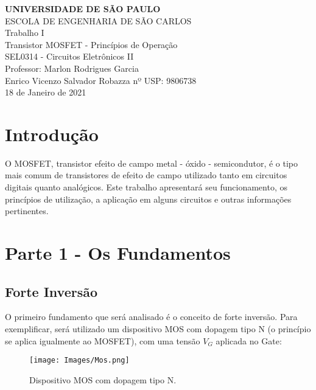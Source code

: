 \documentclass[12pt]{article}
\begin{document}
\setlength{\droptitle}{45mm}    
\begin{titlepage}
\begin{center}
\uppercase{
\textbf{Universidade de São Paulo}\\
\textsc{Escola de Engenharia de São Carlos}
}
\hspace{5mm}\\[6cm]
\Huge{Trabalho I}\\[0.5cm]
\Large{Transistor MOSFET - Princípios de Operação}\\[3cm]
\Large{SEL0314 - Circuitos Eletrônicos II \\ Professor:  Marlon Rodrigues Garcia}\\[4cm]

\large{ 
Enrico Vicenzo Salvador Robazza  nº USP: 9806738\\[3cm]
18 de Janeiro de 2021
}
\end{center}
\end{titlepage}



\section{Introdução}

O MOSFET, transistor efeito de campo metal - óxido - semicondutor, é o tipo mais comum de transistores de efeito de campo utilizado tanto em circuitos digitais quanto analógicos.
	Este trabalho apresentará seu funcionamento, os princípios de utilização, a aplicação em alguns circuitos e outras informações pertinentes.

\section{Parte 1 - Os Fundamentos}

\subsection{Forte Inversão}

O primeiro fundamento que será analisado é o conceito de forte inversão. Para exemplificar, será utilizado um dispositivo MOS com dopagem tipo N (o princípio se aplica igualmente ao MOSFET), com uma tensão $V_G$ aplicada no Gate:

\begin{figure}[H]
  \begin{center}
    \texttt{[image: Images/Mos.png]}
  \end{center}
  \caption{Dispositivo MOS com dopagem tipo N.}
\end{figure}
\end{document}
